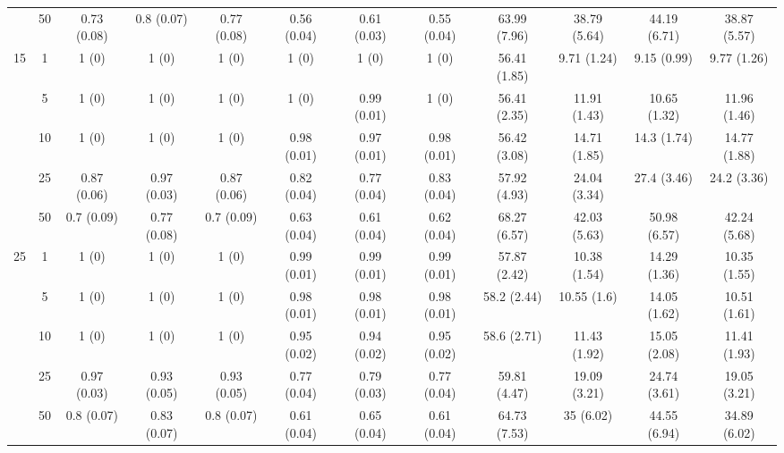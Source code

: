 \documentclass[11pt]{article}
\theoremstyle{definition}
\begin{document}
\begin{table}[H]
\begin{center}
{\begin{tabular}{cc|ccc|ccc|cccc|}
    & 50   & 0.73 (0.08) & 0.8 (0.07) & 0.77 (0.08) & 0.56 (0.04) & 0.61 (0.03) & 0.55 (0.04) & 63.99 (7.96) & 38.79 (5.64) & 44.19 (6.71) & 38.87 (5.57) \\[.3cm] 
  \multirow{5}{*}{15} & 1   & 1 (0) & 1 (0) & 1 (0) & 1 (0) & 1 (0) & 1 (0) & 56.41 (1.85) & 9.71 (1.24) & 9.15 (0.99) & 9.77 (1.26) \\ 
    & 5   & 1 (0) & 1 (0) & 1 (0) & 1 (0) & 0.99 (0.01) & 1 (0) & 56.41 (2.35) & 11.91 (1.43) & 10.65 (1.32) & 11.96 (1.46) \\ 
    & 10   & 1 (0) & 1 (0) & 1 (0) & 0.98 (0.01) & 0.97 (0.01) & 0.98 (0.01) & 56.42 (3.08) & 14.71 (1.85) & 14.3 (1.74) & 14.77 (1.88) \\ 
    & 25   & 0.87 (0.06) & 0.97 (0.03) & 0.87 (0.06) & 0.82 (0.04) & 0.77 (0.04) & 0.83 (0.04) & 57.92 (4.93) & 24.04 (3.34) & 27.4 (3.46) & 24.2 (3.36) \\ 
    & 50   & 0.7 (0.09) & 0.77 (0.08) & 0.7 (0.09) & 0.63 (0.04) & 0.61 (0.04) & 0.62 (0.04) & 68.27 (6.57) & 42.03 (5.63) & 50.98 (6.57) & 42.24 (5.68) \\[.3cm] 
    \multirow{5}{*}{25} & 1   & 1 (0) & 1 (0) & 1 (0) & 0.99 (0.01) & 0.99 (0.01) & 0.99 (0.01) & 57.87 (2.42) & 10.38 (1.54) & 14.29 (1.36) & 10.35 (1.55) \\ 
  & 5   & 1 (0) & 1 (0) & 1 (0) & 0.98 (0.01) & 0.98 (0.01) & 0.98 (0.01) & 58.2 (2.44) & 10.55 (1.6) & 14.05 (1.62) & 10.51 (1.61) \\ 
  & 10   & 1 (0) & 1 (0) & 1 (0) & 0.95 (0.02) & 0.94 (0.02) & 0.95 (0.02) & 58.6 (2.71) & 11.43 (1.92) & 15.05 (2.08) & 11.41 (1.93) \\ 
   & 25   & 0.97 (0.03) & 0.93 (0.05) & 0.93 (0.05) & 0.77 (0.04) & 0.79 (0.03) & 0.77 (0.04) & 59.81 (4.47) & 19.09 (3.21) & 24.74 (3.61) & 19.05 (3.21) \\ 
    & 50   & 0.8 (0.07) & 0.83 (0.07) & 0.8 (0.07) & 0.61 (0.04) & 0.65 (0.04) & 0.61 (0.04) & 64.73 (7.53) & 35 (6.02) & 44.55 (6.94) & 34.89 (6.02) \\
\end{tabular}}
   \end{center}
      \vspace{-.5cm}
\end{table}




\end{document}
